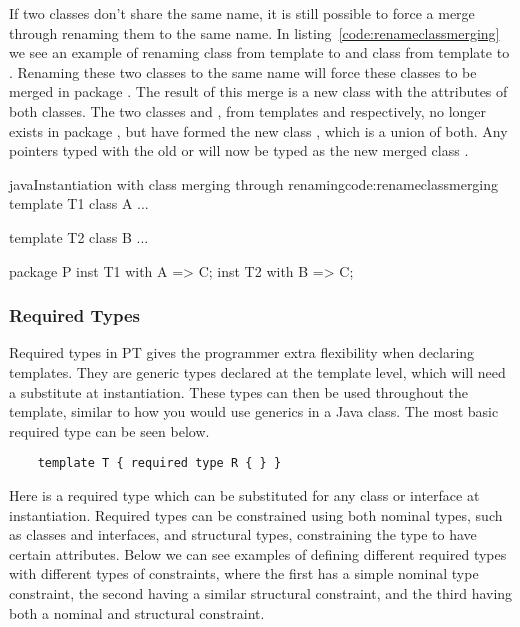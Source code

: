 If two classes don't share the same name, it is still possible to force a merge through renaming them to the same name.
In listing~\vref{code:renameclassmerging} we see an example of renaming class  from template  to  and class  from template  to .
Renaming these two classes to the same name will force these classes to be merged in package .
The result of this merge is a new class  with the attributes of both classes.
The two classes  and , from templates  and  respectively, no longer exists in package , but have formed the new class , which is a union of both.
Any pointers typed with the old  or  will now be typed as the new merged class .

\begin{code}{java}{Instantiation with class merging through renaming}{code:renameclassmerging}
template T1 {
    class A {
        ...
    }
}

template T2 {
    class B {
        ...
    }
}

package P {
    inst T1 with A => C;
    inst T2 with B => C;
}
\end{code}

\subsubsection{Required Types}\label{subsubsec:required-types}

Required types in PT gives the programmer extra flexibility when declaring templates.
They are generic types declared at the template level, which will need a substitute at instantiation.
These types can then be used throughout the template, similar to how you would use generics in a Java class.
The most basic required type can be seen below.

\begin{verbatim}
    template T { required type R { } }
\end{verbatim}

Here  is a required type which can be substituted for any class or interface at instantiation.
Required types can be constrained using both nominal types, such as classes and interfaces, and structural types, constraining the type to have certain attributes.
Below we can see examples of defining different required types with different types of constraints, where the first has a simple nominal type constraint, the second having a similar structural constraint, and the third having both a nominal and structural constraint.

